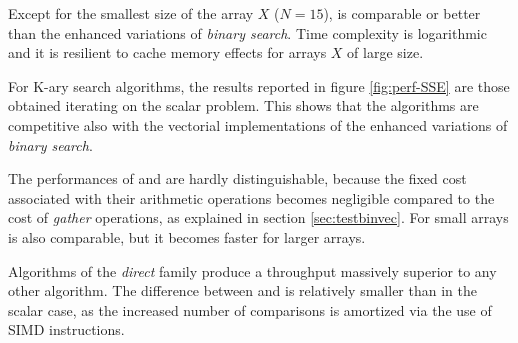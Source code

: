 \documentclass[preprint,1p,times]{elsarticle}
\begin{document}
Except for the smallest size of the array $X$ ($N=15$), \textit{\MKLName} is comparable or better than the enhanced variations of \textit{binary search}. Time complexity is logarithmic and it is resilient to cache memory effects for arrays $X$ of large size.

For {K-ary search} algorithms, the results reported in figure \ref{fig:perf-SSE} are those obtained iterating on the scalar problem. This shows that the algorithms are competitive also with the vectorial implementations of the enhanced variations of \textit{binary search}.

The performances of \textit{\ClassicOffsetName} and \textit{\BitSetName} are hardly distinguishable, because the fixed cost associated with their arithmetic operations becomes negligible compared to the cost of \textit{gather} operations, as explained in section \ref{sec:testbinvec}. For small arrays \textit{\EytzingerName} is also comparable, but it becomes faster for larger arrays.

Algorithms of the \textit{direct} family produce a throughput massively superior to any other algorithm. The difference between \textit{\DirectName} and \textit{\DirectGapName} is relatively smaller than in the scalar case, as the increased number of comparisons is amortized via the use of SIMD instructions. 
\end{document}
